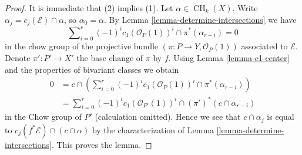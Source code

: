 \documentclass[10pt,a4paper]{amsart}
\theoremstyle{plain}
\theoremstyle{definition}
\theoremstyle{remark}
\numberwithin{equation}{subsection}
\def\CH{\mathop{\mathrm{CH}}\nolimits}
\begin{document}
\begin{proof}
It is immediate that (2) implies (1).
Let $\alpha \in \CH_k(X)$. Write $\alpha_j = c_j(\mathcal{E}) \cap \alpha$, so
$\alpha_0 = \alpha$. By Lemma \ref{lemma-determine-intersections} we have
$$
\sum\nolimits_{i = 0}^r
(-1)^i c_1(\mathcal{O}_P(1))^i \cap
\pi^*(\alpha_{r - i}) = 0
$$
in the chow group of the projective bundle
$(\pi : P \to Y, \mathcal{O}_P(1))$
associated to $\mathcal{E}$. Denote $\pi' : P' \to X'$ the base change
of $\pi$ by $f$. Using Lemma \ref{lemma-c1-center} and
the properties of bivariant classes we obtain
\begin{align*}
0 & = c \cap \left(\sum\nolimits_{i = 0}^r
(-1)^i c_1(\mathcal{O}_P(1))^i \cap
\pi^*(\alpha_{r - i})\right) \\
& =
\sum\nolimits_{i = 0}^r
(-1)^i c_1(\mathcal{O}_{P'}(1))^i \cap
(\pi')^*(c \cap \alpha_{r - i})
\end{align*}
in the Chow group of $P'$ (calculation omitted).
Hence we see that $c \cap \alpha_j$ is
equal to $c_j(f^*\mathcal{E}) \cap (c \cap \alpha)$ by the characterization
of Lemma \ref{lemma-determine-intersections}.
This proves the lemma.
\end{proof}
\end{document}
